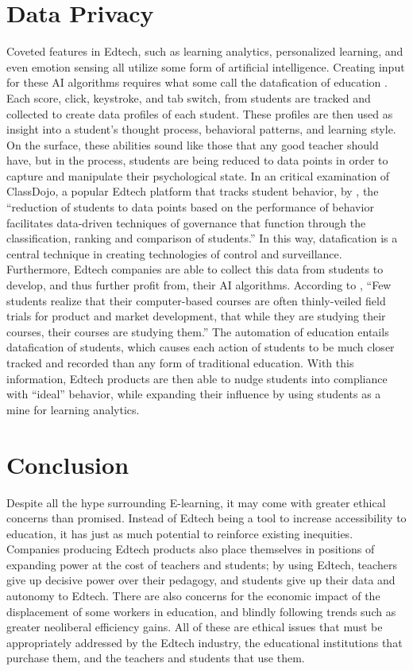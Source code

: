 \documentclass[10pt,twocolumn]{article}
\begin{document}
\section{Data Privacy}
Coveted features in Edtech, such as learning analytics, personalized learning, and even emotion sensing all utilize some form of artificial intelligence. Creating input for these AI algorithms requires what some call the datafication of education \cite{williamson_2017}. Each score, click, keystroke, and tab switch, from students are tracked and collected to create data profiles of each student. These profiles are then used as insight into a student’s thought process, behavioral patterns, and learning style. On the surface, these abilities sound like those that any good teacher should have, but in the process, students are being reduced to data points in order to capture and manipulate their psychological state. In an critical examination of ClassDojo, a popular Edtech platform that tracks student behavior, by \textcite{manolev_2019}, the “reduction of students to data points based on the performance of behavior facilitates data-driven techniques of governance that function through the classification, ranking and comparison of students.” In this way, datafication is a central technique in creating technologies of control and surveillance. Furthermore, Edtech companies are able to collect this data from students to develop, and thus further profit from, their AI algorithms. According to \textcite{williamson_2017}, “Few students realize that their computer-based courses are often thinly-veiled field trials for product and market development, that while they are studying their courses, their courses are studying them.” The automation of education entails datafication of students, which causes each action of students to be much closer tracked and recorded than any form of traditional education. With this information, Edtech products are then able to nudge students into compliance with “ideal” behavior, while expanding their influence by using students as a mine for learning analytics.

\section{Conclusion}
Despite all the hype surrounding E-learning, it may come with greater ethical concerns than promised. Instead of Edtech being a tool to increase accessibility to education, it has just as much potential to reinforce existing inequities. Companies producing Edtech products also place themselves in positions of expanding power at the cost of teachers and students; by using Edtech, teachers give up decisive power over their pedagogy, and students give up their data and autonomy to Edtech. There are also concerns for the economic impact of the displacement of some workers in education, and blindly following trends such as greater neoliberal efficiency gains. All of these are ethical issues that must be appropriately addressed by the Edtech industry, the educational institutions that purchase them, and the teachers and students that use them. 

\printbibliography 
\end{document}

